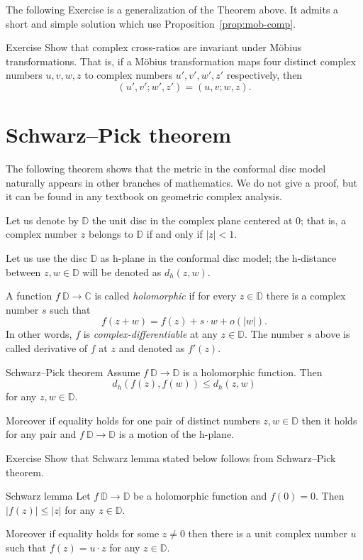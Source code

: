 The following Exercise is a generalization of the Theorem above.
It admits a short and simple solution which use Proposition~\ref{prop:mob-comp}.

\begin{thm}{Exercise}\label{ex:C-cross-ratio}
Show that 
complex cross-ratios are invariant under M\"obius transformations. 
That is, if a M\"obius transformation maps four distinct complex numbers $u, v, w, z$ to complex numbers $u', v', w', z'$ respectively, then
$$
(u',v';w',z')
=
(u,v;w,z).
$$

\end{thm}

\section*{Schwarz--Pick theorem}
The following theorem shows 
that the metric in the conformal disc model naturally appears in other branches of mathematics.
We do not give a proof, but it can be found in any textbook on geometric complex analysis.

Let us denote by $\mathbb{D}$
the unit disc in the complex plane centered at $0$;
that is, a complex number $z$
belongs to $\mathbb{D}$ if and only if $|z|<1$.

Let us use the disc $\mathbb{D}$ as h-plane in the conformal disc model;
the h-distance between $z, w\in\mathbb{D}$ will be denoted as $d_h(z,w)$.

A function $f\:\mathbb{D}\to \mathbb{C}$ is called \emph{holomorphic} if for every $z\in \mathbb{D}$
there is a complex number $s$ such that
\[f(z+w)=f(z)+s\cdot w+o(|w|).\]
In other words, $f$ is {}\emph{complex-differentiable}
at any $z\in\mathbb{D}$.
The number $s$ above is called derivative of $f$ at $z$ and denoted as $f'(z)$.

\begin{thm}{Schwarz--Pick theorem}
Assume $f\: \mathbb{D}\to \mathbb{D}$ is a holomorphic function.
Then 
\[d_h(f(z),f(w))\le d_h(z,w)\]
for any $z,w\in \mathbb{D}$.

Moreover if equality holds for one pair of distinct numbers $z,w\in \mathbb{D}$ then it holds for any pair and  $f\: \mathbb{D}\to \mathbb{D}$ is a motion of the h-plane.
\end{thm}

\begin{thm}{Exercise}\label{ex:schwarz}
Show that Schwarz lemma stated below 
follows from Schwarz--Pick theorem.
\end{thm}

\begin{thm}{Schwarz lemma}
Let $f\: \mathbb{D}\to \mathbb{D}$ be a holomorphic function
and $f(0)=0$.
Then 
$|f(z)|\le |z|$
for any $z\in \mathbb{D}$.

Moreover if equality holds for some $z\ne 0$ then there is a unit complex number $u$ 
such that 
$f(z)=u\cdot z$
for any $z\in\mathbb{D}$.
\end{thm}






